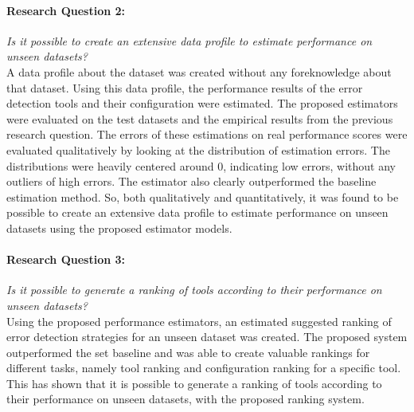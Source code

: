 \paragraph{Research Question 2:} \textit{Is it possible to create an extensive data profile to estimate performance on unseen datasets?}
~\\A data profile about the dataset was created without any foreknowledge about that dataset. Using this data profile, the performance results of the error detection tools and their configuration were estimated. The proposed estimators were evaluated on the test datasets and the empirical results from the previous research question. The errors of these estimations on real performance scores were evaluated qualitatively by looking at the distribution of estimation errors. The distributions were heavily centered around 0, indicating low errors, without any outliers of high errors. The estimator also clearly outperformed the baseline estimation method. So, both qualitatively and quantitatively, it was found to be possible to create an extensive data profile to estimate performance on unseen datasets using the proposed estimator models.

\newpage
\paragraph{Research Question 3:} \textit{Is it possible to generate a ranking of tools according to their performance on unseen datasets?}
~\\Using the proposed performance estimators, an estimated suggested ranking of error detection strategies for an unseen dataset was created. The proposed system outperformed the set baseline and was able to create valuable rankings for different tasks, namely tool ranking and configuration ranking for a specific tool. This has shown that it is possible to generate a ranking of tools according to their performance on unseen datasets, with the proposed ranking system. 

